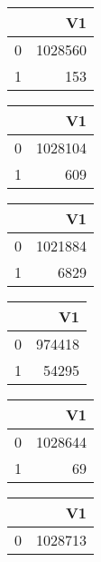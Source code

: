 \bigskip\bigskip
\centering
\begin{tabular}{rr}
  \hline
 & V1 \\ 
  \hline
0 & 1028560 \\ 
  1 & 153 \\ 
   \hline
\end{tabular}

\bigskip\bigskip
\centering
\begin{tabular}{rr}
  \hline
 & V1 \\ 
  \hline
0 & 1028104 \\ 
  1 & 609 \\ 
   \hline
\end{tabular}

\bigskip\bigskip
\centering
\begin{tabular}{rr}
  \hline
 & V1 \\ 
  \hline
0 & 1021884 \\ 
  1 & 6829 \\ 
   \hline
\end{tabular}

\bigskip\bigskip
\centering
\begin{tabular}{rr}
  \hline
 & V1 \\ 
  \hline
0 & 974418 \\ 
  1 & 54295 \\ 
   \hline
\end{tabular}

\bigskip\bigskip
\centering
\begin{tabular}{rr}
  \hline
 & V1 \\ 
  \hline
0 & 1028644 \\ 
  1 &  69 \\ 
   \hline
\end{tabular}

\bigskip\bigskip
\centering
\begin{tabular}{rr}
  \hline
 & V1 \\ 
  \hline
0 & 1028713 \\ 
   \hline
\end{tabular}

